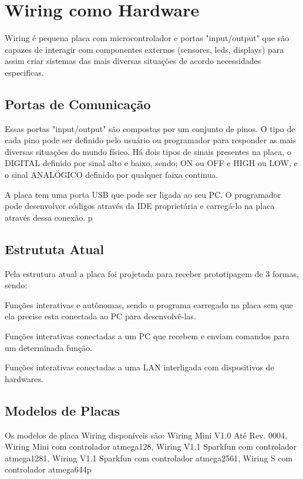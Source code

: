 \section[Wiring como Hardware]{Wiring como Hardware}

Wiring é pequena placa com microcontrolador e portas "input/output" que são capazes de interagir com componentes externos (sensores, leds, displays) para assim criar sistemas das mais diversas situações de acordo necessidades especificas.

\subsection[Portas de Comunicação]{Portas de Comunicação}

Essas portas "input/output" são compostas por um conjunto de pinos. O tipo de cada pino pode ser definido pelo usuário ou programador para responder as mais diversas situações do mundo físico. Há dois tipos de sinais presentes na placa, o DIGITAL definido por sinal alto e baixo, sendo; ON ou OFF e HIGH ou LOW, e o sinal ANALÓGICO definido por qualquer faixa continua.

A placa tem uma porta USB que pode ser ligada ao seu PC. O programador pode desenvolver códigos através da IDE proprietária e carregá-lo na placa através dessa conexão.
p
\subsection[Estrututa Atual]{Estrututa Atual}

Pela estrutura atual a placa foi projetada para receber prototipagem de 3 formas, sendo:
    \begin{alineas}
        \item Funções interativas e autônomas, sendo o programa carregado na placa sem que ela precise esta conectada ao PC para desenvolvê-las.
	    \item Funções interativas conectadas a um PC que recebem e enviam comandos para um determinada função.
        \item Funções interativas conectadas a uma LAN interligada com dispositivos de hardwares.
    \end{alineas}
	
\subsection[Modelos de Placas]{Modelos de Placas}

Os modelos de placa Wiring disponíveis são: Wiring Mini V1.0 Até Rev. 0004, Wiring Mini com controlador atmega128, Wiring V1.1 Sparkfun com controlador atmega1281, Wiring V1.1 Sparkfun com controlador atmega2561, Wiring S com controlador atmega644p

